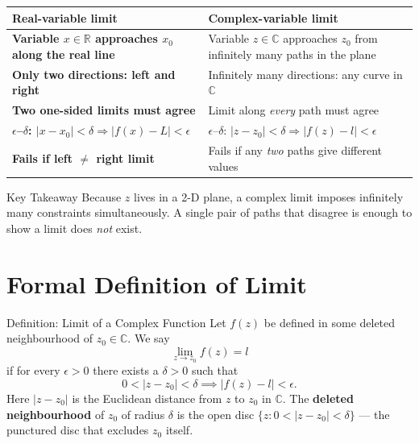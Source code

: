 \documentclass[12pt,a4paper]{article}
\begin{document}
\vspace{0.5em}
\begin{center}
\begin{tabular}{>{\bfseries}p{5.5cm} p{8cm}}
\toprule
Real-variable limit & Complex-variable limit \\
\midrule
Variable $x \in \mathbb{R}$ approaches $x_0$ along the real line &
Variable $z \in \mathbb{C}$ approaches $z_0$ from infinitely many paths in the plane \\
\addlinespace
Only two directions: left and right &
Infinitely many directions: any curve in $\mathbb{C}$ \\
\addlinespace
Two one-sided limits must agree &
Limit along \emph{every} path must agree \\
\addlinespace
$\epsilon$--$\delta$: $|x - x_0| < \delta \Rightarrow |f(x) - L| < \epsilon$ &
$\epsilon$--$\delta$: $|z - z_0| < \delta \Rightarrow |f(z) - l| < \epsilon$ \\
\addlinespace
Fails if left $\neq$ right limit &
Fails if any \emph{two} paths give different values \\
\bottomrule
\end{tabular}
\end{center}

\begin{learnbox}{Key Takeaway}
Because $z$ lives in a 2-D plane, a complex limit imposes infinitely many
constraints simultaneously.  A single pair of paths that disagree is enough
to show a limit does \emph{not} exist.
\end{learnbox}

\section{Formal Definition of Limit}

\begin{infobox}{Definition: Limit of a Complex Function}
Let $f(z)$ be defined in some deleted neighbourhood of $z_0 \in \mathbb{C}$.
We say
\[
  \lim_{z \to z_0} f(z) = l
\]
if for every $\epsilon > 0$ there exists a $\delta > 0$ such that
\[
  0 < |z - z_0| < \delta \implies |f(z) - l| < \epsilon.
\]
Here $|z - z_0|$ is the Euclidean distance from $z$ to $z_0$ in $\mathbb{C}$.
The \textbf{deleted neighbourhood} of $z_0$ of radius $\delta$ is the open disc
$\{z : 0 < |z - z_0| < \delta\}$ --- the punctured disc that excludes $z_0$ itself.
\end{infobox}
\end{document}
